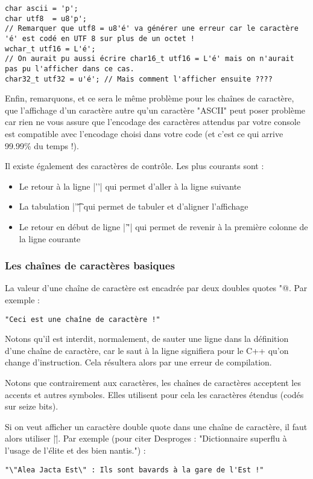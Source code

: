 \begin{lstlisting}
char ascii = 'p';
char utf8  = u8'p';
// Remarquer que utf8 = u8'é' va générer une erreur car le caractère 'é' est codé en UTF 8 sur plus de un octet !
wchar_t utf16 = L'é';
// On aurait pu aussi écrire char16_t utf16 = L'é' mais on n'aurait pas pu l'afficher dans ce cas.
char32_t utf32 = u'é'; // Mais comment l'afficher ensuite ????
\end{lstlisting}

Enfin, remarquons, et ce sera le même problème pour les chaînes de caractère, que l'affichage d'un caractère autre
qu'un caractère "ASCII" peut poser problème car rien ne vous assure que l'encodage des caractères attendus par votre console est compatible avec l'encodage choisi dans votre code (et c'est ce qui arrive 99.99\% du temps !).

Il existe également des caractères de contrôle. Les plus courants sont :
\begin{itemize}
  \item Le retour à la ligne |'\n'| qui permet d'aller à la ligne suivante
  \item La tabulation |'\t'| qui permet de tabuler et d'aligner l'affichage
  \item Le retour en début de ligne |'\r'| qui permet de revenir à la première colonne de la ligne courante
\end{itemize}

\subsubsection{Les chaînes de caractères basiques}

La valeur d'une chaîne de caractère est encadrée par deux doubles quotes \verb@"@. Par exemple :
\begin{lstlisting}
"Ceci est une chaîne de caractère !"
\end{lstlisting}

Notons qu'il est interdit, normalement, de sauter une ligne dans la définition d'une chaîne de caractère,
car le saut à la ligne signifiera pour le C++ qu'on change d'instruction. Cela résultera alors par une erreur
de compilation.

Notons que contrairement aux caractères, les chaînes de caractères acceptent les accents et autres symboles.
Elles utilisent pour cela les caractères étendus (codés sur seize bits).

Si on veut afficher un caractère double quote dans une chaîne de caractère, il faut alors utiliser |\"|.
Par exemple (pour citer Desproges : "Dictionnaire superflu à l'usage de l'élite et des bien nantis.") :
\begin{lstlisting}
"\"Alea Jacta Est\" : Ils sont bavards à la gare de l'Est !" 
\end{lstlisting}

